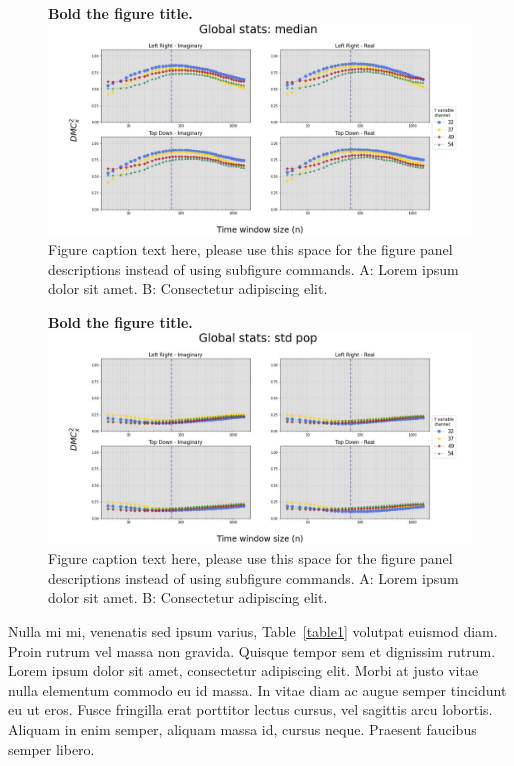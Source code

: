\documentclass[10pt,letterpaper]{article}
\begin{document}
\begin{figure}[!h]
    \caption{{\bf Bold the figure title.}
    \includegraphics[width=.9\textwidth]{../output/figs/global/median.jpg}
      Figure caption text here, please use this space for the figure panel descriptions instead of using subfigure commands. A: Lorem ipsum dolor sit amet. B: Consectetur adipiscing elit.}
    \label{glob_median}
\end{figure}

\begin{figure}[!h]
    \caption{{\bf Bold the figure title.}
    \includegraphics[width=.9\textwidth]{../output/figs/global/std pop.jpg}
    Figure caption text here, please use this space for the figure panel descriptions instead of using subfigure commands. A: Lorem ipsum dolor sit amet. B: Consectetur adipiscing elit.}
    \label{glob_std_pop}
\end{figure}

Nulla mi mi, venenatis sed ipsum varius, Table~\ref{table1} volutpat euismod diam. Proin rutrum vel massa non gravida. Quisque tempor sem et dignissim rutrum. Lorem ipsum dolor sit amet, consectetur adipiscing elit. Morbi at justo vitae nulla elementum commodo eu id massa. In vitae diam ac augue semper tincidunt eu ut eros. Fusce fringilla erat porttitor lectus cursus, vel sagittis arcu lobortis. Aliquam in enim semper, aliquam massa id, cursus neque. Praesent faucibus semper libero.
\end{document}

